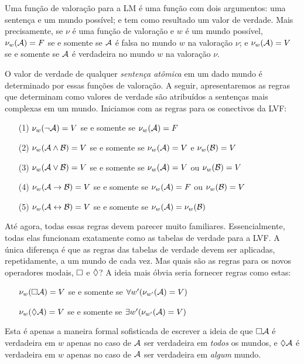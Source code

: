 Uma função de valoração para a LM é uma função com dois argumentos:  uma sentença  e um mundo  possível;  e tem como resultado um valor de verdade.   
Mais precisamente, se $\nu$   é uma função de valoração  e $w$ é um mundo possível,   $\nu_w(\mathcal{A})=F$  se e somente se $\mathcal{A}$ é falsa no mundo $w$ na valoração $\nu$; e $\nu_w(\mathcal{A})=V$  se e somente se $\mathcal{A}$  é verdadeira no mundo $w$ na valoração $\nu$.

O valor de verdade de  qualquer \emph{sentença atômica} em um dado mundo é determinado por essas funções de valoração.  A seguir, apresentaremos as  regras   que determinam como valores de verdade são atribuídos a sentenças mais complexas em um mundo. Iniciamos com  as regras para os conectivos da  LVF:

\begin{itemize}
	\item[(1)]$\nu_w(\neg\mathcal{A})=V$ se e somente se $\nu_w(\mathcal{A})=F$
	\item[(2)]$\nu_w(\mathcal{A}\wedge\mathcal{B})=V$ se e somente se $\nu_w(\mathcal{A})=V$ e $\nu_w(\mathcal{B})=V$
	\item[(3)]$\nu_w(\mathcal{A}\vee\mathcal{B})=V$ se e somente se $\nu_w(\mathcal{A})=V$ ou $\nu_w(\mathcal{B})=V$
	\item[(4)]$\nu_w(\mathcal{A}\rightarrow\mathcal{B})=V$ se e somente se $\nu_w(\mathcal{A})=F$ ou $\nu_w(\mathcal{B})=V$
	\item[(5)]$\nu_w(\mathcal{A}\leftrightarrow\mathcal{B})=V$ se e somente se $\nu_w(\mathcal{A})=\nu_w(\mathcal{B})$  
\end{itemize}
 

Até agora, todas essas regras devem parecer muito familiares. Essencialmente, todas elas funcionam exatamente como as tabelas de verdade para a LVF. A única diferença é que as regras das tabelas de verdade devem ser aplicadas, repetidamente, a um mundo de cada vez.
Mas quais são as regras para os novos operadores modais, $\Box$ e $\Diamond$? A ideia mais óbvia seria fornecer regras como estas:
\begin{itemize}
	\item[]$\nu_w(\Box \mathcal{A})=V$ se e somente se $\forall w' (\nu_{w'}(\mathcal{A})=V)$
	\item[]$\nu_w(\Diamond \mathcal{A})=V $ se e somente se $\exists w' (\nu_{w'}(\mathcal{A})=V)$
\end{itemize}
Esta é apenas a maneira formal sofisticada de escrever a ideia de que $\Box\mathcal{A}$ é verdadeira em $w$ apenas no caso de $\mathcal{A}$ ser verdadeira em \emph{todos} os mundos, e $\Diamond\mathcal{A}$ é verdadeira em $w$ apenas no caso de $\mathcal{A}$ ser verdadeira em \emph{algum} mundo.

